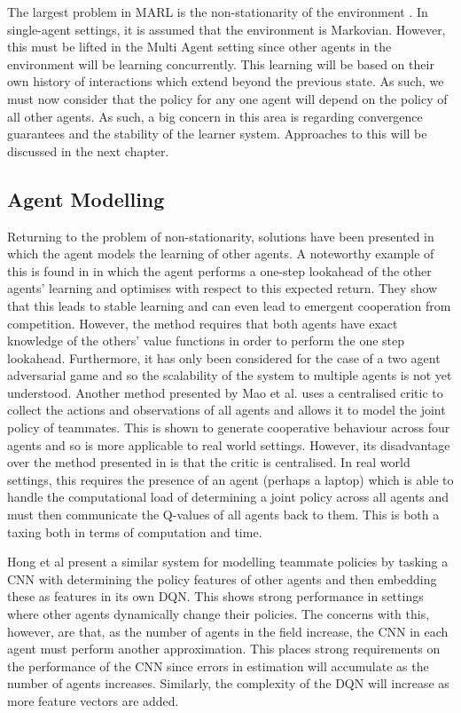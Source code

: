 \documentclass[preprint,8pt]{report}
\begin{document}
The largest problem in MARL is the non-stationarity of the environment \cite{Hernandez-LealA}. In single-agent settings, it is assumed that the environment is Markovian. However, this must be lifted in the Multi Agent setting since other agents in the environment will be learning concurrently. This learning will be based on their own history of interactions which extend beyond the previous state. As such, we must now consider that the policy for any one agent will depend on the policy of all other agents. As such, a big concern in this area is regarding convergence guarantees and the stability of the learner system. Approaches to this will be discussed in the next chapter. 

\subsection*{Agent Modelling}

Returning to the problem of non-stationarity, solutions have been presented in which the agent models the learning of other agents. A noteworthy example of this is found in \cite{Foerster2018LearningAwareness} in which the agent performs a one-step lookahead of the other agents' learning and optimises with respect to this expected return. They show that this leads to stable learning and can even lead to emergent cooperation from competition. However, the method requires that both agents have exact knowledge of the others' value functions in order to perform the one step lookahead. Furthermore, it has only been considered for the case of a two agent adversarial game and so the scalability of the system to multiple agents is not yet understood. Another method presented by Mao et al. \cite{MaoModellingDDPG} uses a centralised critic to collect the actions and observations of all agents and allows it to model the joint policy of teammates. This is shown to generate cooperative behaviour across four agents and so is more applicable to real world settings. However, its disadvantage over the method presented in \cite{Foerster2018LearningAwareness} is that the critic is centralised. In real world settings, this requires the presence of an agent (perhaps a laptop) which is able to handle the computational load of determining a joint policy across all agents and must then communicate the Q-values of all agents back to them. This is both a taxing both in terms of computation and time. 

Hong et al \cite{Hong2018ASystems} present a similar system for modelling teammate policies by tasking a CNN with determining the policy features of other agents and then embedding these as features in its own DQN. This shows strong performance in settings where other agents dynamically change their policies. The concerns with this, however, are that, as the number of agents in the field increase, the CNN in each agent must perform another approximation. This places strong requirements on the performance of the CNN since errors in estimation will accumulate as the number of agents increases. Similarly, the complexity of the DQN will increase as more feature vectors are added. 
\end{document}
